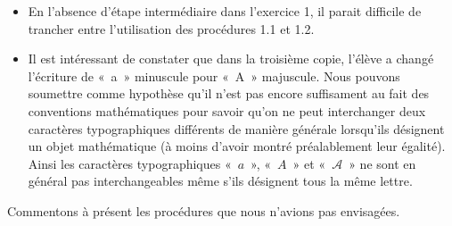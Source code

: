 \documentclass{report}
\theoremstyle{definition}
\begin{document}
\begin{itemize}
\item En l'absence d'étape intermédiaire dans l'exercice 1, il parait difficile de trancher entre l'utilisation des procédures 1.1 et 1.2.

\item Il est intéressant de constater que dans la troisième copie, l'élève a changé l'écriture de «~a~» minuscule pour «~A~» majuscule. Nous pouvons soumettre comme hypothèse qu'il n'est pas encore suffisament au fait des conventions mathématiques pour savoir qu'on ne peut interchanger deux caractères typographiques différents de manière générale lorsqu'ils désignent un objet mathématique (à moins d'avoir montré préalablement leur égalité). Ainsi les caractères typographiques «~$a$~», «~$A$~» et «~$\mathscr{A}$~» ne sont en général pas interchangeables même s'ils désignent tous la même lettre.
\end{itemize}

Commentons à présent les procédures que nous n'avions pas envisagées.
\end{document}

